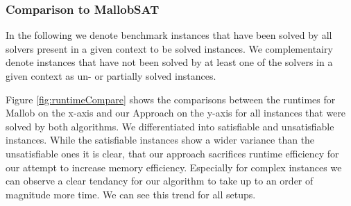 \documentclass[12pt,a4paper,twoside]{scrartcl}
\numberwithin{equation}{section}
\begin{document}
\subsubsection{Comparison to MallobSAT}

In the following we denote benchmark instances that have been solved by all solvers present in a given context to be solved instances. We complementairy denote instances that have not been solved by at least one of the solvers in a given context as un- or partially solved instances.

Figure \ref{fig:runtimeCompare} shows the comparisons between the runtimes for Mallob on the x-axis and our Approach on the y-axis for all instances that were solved by both algorithms. We differentiated into satisfiable and unsatisfiable instances. While the satisfiable instances show a wider variance than the unsatisfiable ones it is clear, that our approach sacrifices runtime efficiency for our attempt to increase memory efficiency. Especially for complex instances we can observe a clear tendancy for our algorithm to take up to an order of magnitude more time. We can see this trend for all setups.
\end{document}
